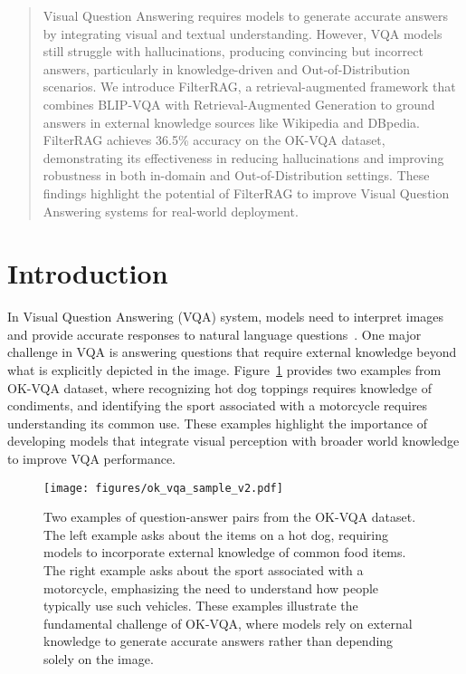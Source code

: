 \begin{abstract}
Visual Question Answering requires models to generate accurate answers by integrating visual and textual understanding. However, VQA models still struggle with hallucinations, producing convincing but incorrect answers, particularly in knowledge-driven and Out-of-Distribution scenarios. We introduce FilterRAG, a retrieval-augmented framework that combines BLIP-VQA with Retrieval-Augmented Generation to ground answers in external knowledge sources like Wikipedia and DBpedia. FilterRAG achieves 36.5\% accuracy on the OK-VQA dataset, demonstrating its effectiveness in reducing hallucinations and improving robustness in both in-domain and Out-of-Distribution settings. These findings highlight the potential of FilterRAG to improve Visual Question Answering systems for real-world deployment.
\end{abstract}

\section{Introduction}
\label{sec:introduction}

In Visual Question Answering (VQA) system, models need to interpret images and provide accurate responses to natural language questions~\cite{antol2015vqa, tu2014joint, marino2019ok}. One major challenge in VQA is answering questions that require external knowledge beyond what is explicitly depicted in the image. Figure~\ref{fig:ok-vqa_sample} provides two examples from OK-VQA dataset, where recognizing hot dog toppings requires knowledge of condiments, and identifying the sport associated with a motorcycle requires understanding its common use. These examples highlight the importance of developing models that integrate visual perception with broader world knowledge to improve VQA performance.

\begin{figure}[t]
    \centering
    \texttt{[image: figures/ok\_vqa\_sample\_v2.pdf]}
    \caption{Two examples of question-answer pairs from the OK-VQA dataset. The left example asks about the items on a hot dog, requiring models to incorporate external knowledge of common food items. The right example asks about the sport associated with a motorcycle, emphasizing the need to understand how people typically use such vehicles. These examples illustrate the fundamental challenge of OK-VQA, where models rely on external knowledge to generate accurate answers rather than depending solely on the image.}
    \label{fig:ok-vqa_sample}
\end{figure}


